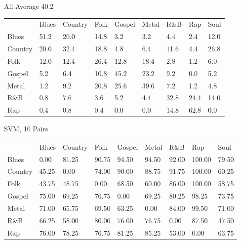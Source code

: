 \documentclass[a4paper,oneside]{article}
\begin{document}
All
Average 40.2
\begin{table}
\begin{tabular}{|l||*{8}{l|}} \hline
 & Blues & Country & Folk & Gospel & Metal & R\&B & Rap & Soul \\ \hhline{|=||*{8}{=|}}
Blues & 51.2 & 20.0 & 14.8 & 3.2 & 3.2 & 4.4 & 2.4 & 12.0 \\ \hline
Country & 20.0 & 32.4 & 18.8 & 4.8 & 6.4 & 11.6 & 4.4 & 26.8 \\ \hline
Folk & 12.0 & 12.4 & 26.4 & 12.8 & 18.4 & 2.8 & 1.2 & 6.0 \\ \hline
Gospel & 5.2 & 6.4 & 10.8 & 45.2 & 23.2 & 9.2 & 0.0 & 5.2 \\ \hline
Metal & 1.2 & 9.2 & 20.8 & 25.6 & 39.6 & 7.2 & 1.2 & 4.8 \\ \hline
R\&B & 0.8 & 7.6 & 3.6 & 5.2 & 4.4 & 32.8 & 24.4 & 14.0 \\ \hline
Rap & 0.4 & 0.8 & 0.4 & 0.0 & 0.0 & 14.8 & 62.8 & 0.0 \\ \hline
\end{tabular}
\end{table}

SVM, 10
Pairs
\begin{table}
\begin{tabular}{|l||*{8}{l|}} \hline
 & Blues & Country & Folk & Gospel & Metal & R\&B & Rap & Soul \\ \hhline{|=||*{8}{=|}}
Blues & 0.00 & 81.25 & 90.75 & 94.50 & 94.50 & 92.00 & 100.00 & 79.50 \\ \hline
Country & 45.25 & 0.00 & 74.00 & 90.00 & 88.75 & 91.75 & 100.00 & 60.25 \\ \hline
Folk & 43.75 & 48.75 & 0.00 & 68.50 & 60.00 & 86.00 & 100.00 & 58.75 \\ \hline
Gospel & 75.00 & 69.25 & 76.75 & 0.00 & 69.25 & 80.25 & 98.25 & 73.75 \\ \hline
Metal & 71.00 & 65.75 & 69.50 & 63.25 & 0.00 & 84.00 & 99.50 & 71.00 \\ \hline
R\&B & 66.25 & 58.00 & 80.00 & 76.00 & 76.75 & 0.00 & 87.50 & 47.50 \\ \hline
Rap & 76.00 & 78.25 & 76.75 & 81.25 & 85.25 & 53.00 & 0.00 & 63.75 \\ \hline
\end{tabular}
\end{table}
\end{document}
